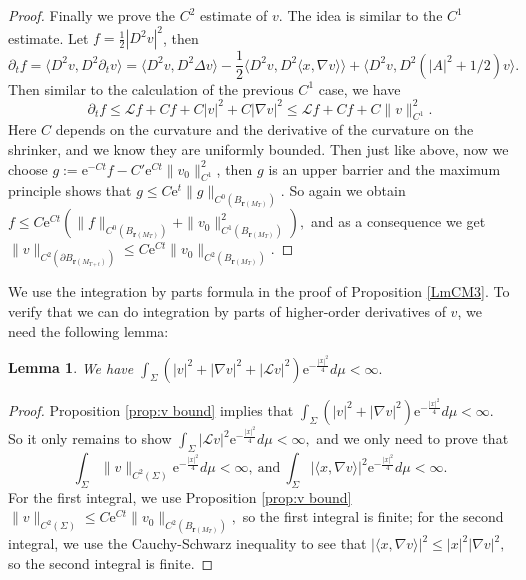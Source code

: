 \documentclass[12pt]{amsart}
\numberwithin{equation}{section}
\newtheorem{lemma}[theorem]{Lemma}
\numberwithin{equation}{section}
\newcommand{\cL}{\mathcal{L}}
\begin{document}
\begin{proof}
		Finally we prove the $C^2$ estimate of $v$. The idea is similar to the $C^1$ estimate. Let $f=\frac{1}{2}|D^2 v|^2$, then
		\[\partial_t f=\langle D^2 v, D^2 \partial_t v\rangle=\langle D^2 v,D^2\Delta v\rangle -\frac{1}{2}\langle D^2 v,D^2 \langle x,\nabla v\rangle \rangle +\langle D^2v, D^2(|A|^2+1/2)v\rangle.\]
		Then similar to the calculation of the previous $C^1$ case, we have
		\begin{equation*}
			\partial_t f\leq \cL f+C f+C |v|^2+C|\nabla v|^2\leq \cL f+Cf +C\|v\|_{C^1}^2.
		\end{equation*}
		Here $C$ depends on the curvature and the derivative of the curvature on the shrinker, and we know they are uniformly bounded. Then just like above, now we choose $g:= \mathrm{e}^{-Ct}f-C'\mathrm{e}^{Ct}\|v_0\|_{C^1}^2$, then $g$ is an upper barrier and the maximum principle shows that 
		$g\leq C\mathrm{e}^{t}\|g\|_{C^0(B_{\mathbf{r}(M_T)})}.$
		So again we obtain $		f \leq C\mathrm{e}^{Ct}(\|f\|_{C^0(B_{\mathbf{r}(M_T)})}+\|v_0\|^2_{C^1(B_{\mathbf{r}(M_T)})}),$ and as a consequence we get 
		$	\|v\|_{C^2(\partial B_{\mathbf{r}(M_{T+t})})}\leq C\mathrm{e}^{Ct}\|v_0\|_{C^2(B_{\mathbf{r}(M_T)})}.$
	\end{proof}
	
	We use the integration by parts formula in the proof of Proposition \ref{LmCM3}. To verify that we can do integration by parts of higher-order derivatives of $v$, we need the following lemma:
	
	\begin{lemma}
		We have $	\int_\Sigma (|v|^2+|\nabla v|^2 +|\cL v|^2)\mathrm{e}^{-\frac{|x|^2}{4}}d\mu <\infty.$
	\end{lemma}
	
	\begin{proof}
		Proposition \ref{prop:v bound} implies that 
		$		\int_\Sigma (|v|^2+|\nabla v|^2)\mathrm{e}^{-\frac{|x|^2}{4}}d\mu <\infty.$
		So it only remains to show
		$	\int_\Sigma |\cL v|^2 \mathrm{e}^{-\frac{|x|^2}{4}}d\mu <\infty,$
		and we only need to prove that 
		\[	\int_\Sigma \|v\|_{C^2(\Sigma)} \mathrm{e}^{-\frac{|x|^2}{4}}d\mu <\infty,\ \text{and}\ \int_\Sigma |\langle x,\nabla v\rangle|^2 \mathrm{e}^{-\frac{|x|^2}{4}}d\mu <\infty.\]
		For the first integral, we use Proposition \ref{prop:v bound} 
		$ \|v\|_{C^2(\Sigma)}\leq C \mathrm{e}^{Ct}\|v_0\|_{C^2(B_{\mathbf{r}(M_T)})},$
		so the first integral is finite; for the second integral, we use the Cauchy-Schwarz inequality to see that
		$|\langle x,\nabla v\rangle|^2\leq |x|^2 |\nabla v|^2,$
		so the second integral is finite.
	\end{proof}
	
\end{document}
